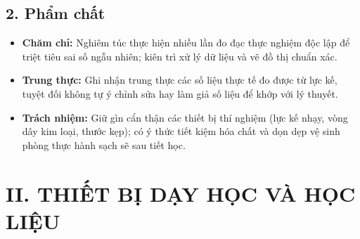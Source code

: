 \documentclass[12pt, a4paper]{article}
\begin{document}
\subsection*{2. Phẩm chất}

\begin{itemize}[leftmargin=1.2cm]
    \item \textbf{Chăm chỉ:} Nghiêm túc thực hiện nhiều lần đo đạc thực nghiệm độc lập để triệt tiêu sai số ngẫu nhiên; kiên trì xử lý dữ liệu và vẽ đồ thị chuẩn xác.
    \item \textbf{Trung thực:} Ghi nhận trung thực các số liệu thực tế đo được từ lực kế, tuyệt đối không tự ý chỉnh sửa hay làm giả số liệu để khớp với lý thuyết.
    \item \textbf{Trách nhiệm:} Giữ gìn cẩn thận các thiết bị thí nghiệm (lực kế nhạy, vòng dây kim loại, thước kẹp); có ý thức tiết kiệm hóa chất và dọn dẹp vệ sinh phòng thực hành sạch sẽ sau tiết học.
\end{itemize}

\vspace{5pt}

\section*{II. THIẾT BỊ DẠY HỌC VÀ HỌC LIỆU}
\end{document}

